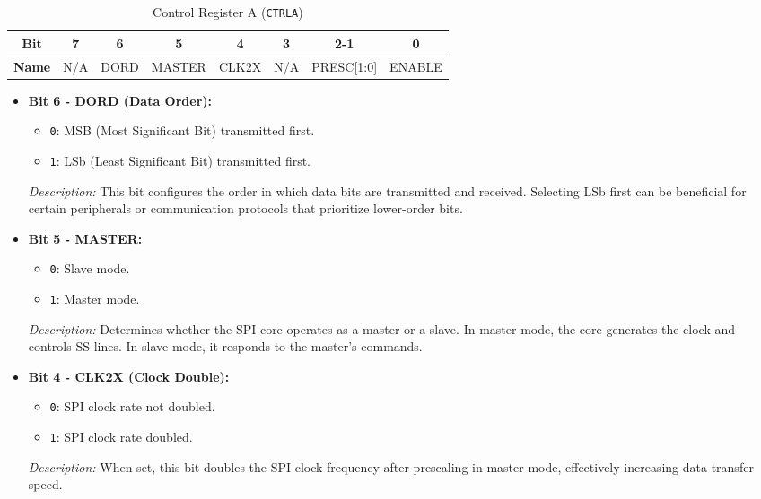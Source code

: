   \begin{table}[H]
      \centering
      \caption{Control Register A (\texttt{CTRLA})}
      \begin{tabular}{@{}cccccccc@{}}
          \toprule
          \textbf{Bit} & 7 & 6 & 5 & 4 & 3 & 2-1 & 0 \\ \midrule
          \textbf{Name} & N/A & DORD & MASTER & CLK2X & N/A & PRESC[1:0] & ENABLE \\ \bottomrule
      \end{tabular}
      \label{tab:ctrl_a}
  \end{table}
  
  \begin{itemize}
      \item \textbf{Bit 6 - DORD (Data Order):} 
      \begin{itemize}
          \item \texttt{0}: MSB (Most Significant Bit) transmitted first.
          \item \texttt{1}: LSb (Least Significant Bit) transmitted first.
      \end{itemize}
      \textit{Description:} This bit configures the order in which data bits are transmitted and received. Selecting LSb first can be beneficial for certain peripherals or communication protocols that prioritize lower-order bits.
      
      \item \textbf{Bit 5 - MASTER:} 
      \begin{itemize}
          \item \texttt{0}: Slave mode.
          \item \texttt{1}: Master mode.
      \end{itemize}
      \textit{Description:} Determines whether the SPI core operates as a master or a slave. In master mode, the core generates the clock and controls SS lines. In slave mode, it responds to the master's commands.
      
      \item \textbf{Bit 4 - CLK2X (Clock Double):} 
      \begin{itemize}
          \item \texttt{0}: SPI clock rate not doubled.
          \item \texttt{1}: SPI clock rate doubled.
      \end{itemize}
      \textit{Description:} When set, this bit doubles the SPI clock frequency after prescaling in master mode, effectively increasing data transfer speed.
      

\end{itemize}
